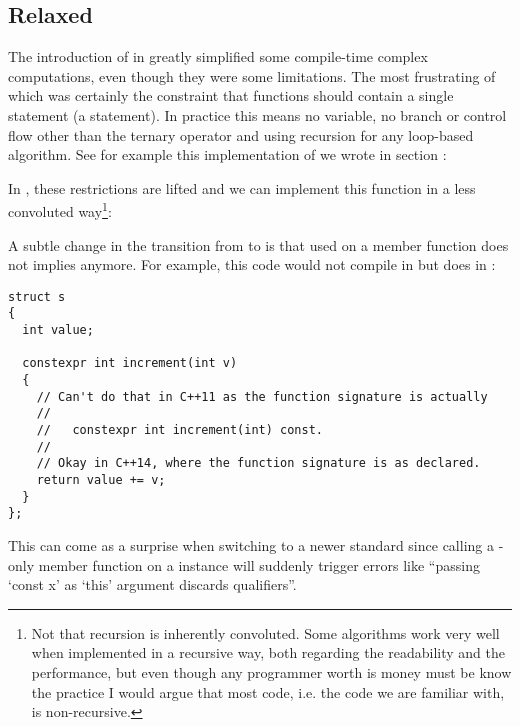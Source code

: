\subsection{Relaxed }

The introduction of  in  
greatly simplified some compile-time complex computations, even though
they were some limitations. The most frustrating of which was
certainly the constraint that  functions should
contain a single statement (a  statement). In practice
this means no variable, no branch or control flow other than the
ternary  operator and using recursion for any loop-based
algorithm. See for example this implementation of  we
wrote in section :



In , these restrictions are lifted and we can implement this
function in a less convoluted way\footnote{Not that recursion is
inherently convoluted. Some algorithms work very well when
implemented in a recursive way, both regarding the readability and the
performance, but even though any programmer worth is money must be
know the practice I would argue that most code, i.e. the code we are
familiar with, is non-recursive.}:



A subtle change in the transition from  to  is that
 used on a member function does not implies
 anymore. For example, this code would not compile in
 but does in :

\begin{lstlisting}
struct s
{
  int value;

  constexpr int increment(int v)
  {
    // Can't do that in C++11 as the function signature is actually
    //
    //   constexpr int increment(int) const.
    //
    // Okay in C++14, where the function signature is as declared.
    return value += v;
  }
};
\end{lstlisting}

This can come as a surprise when switching to a newer standard since
calling a -only member function on a 
instance will suddenly trigger errors like ``passing ‘const x’ as
‘this’ argument discards qualifiers''.
